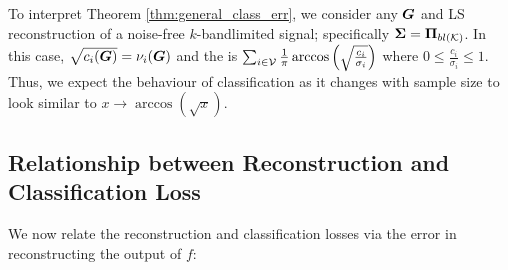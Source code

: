 
 To interpret Theorem \ref{thm:general_class_err}, we consider any $\bm{G}$ and LS reconstruction of a noise-free $k$-bandlimited signal; specifically $\matr{\Sigma} = \projbl$. In this case, $\sqrt{c_{i}(\bm{G})} = \nu_{i}(\bm{G})$ and the {} is $\sum_{i \in \mathcal{V}} \frac{1}{\pi}\arccos{\left(\sqrt{\frac{c_{i}}{\sigma_{i}}}\right)}$ where $0 \leq \frac{c_{i}}{\sigma_{i}} \leq 1$. Thus, we expect the behaviour of classification  as it changes with sample size to look similar to $x \to \arccos{\left(\sqrt{x}\right)}$.



\subsection{Relationship between Reconstruction and Classification Loss}
We now relate the reconstruction and classification losses via the error in reconstructing the output of $f$:

